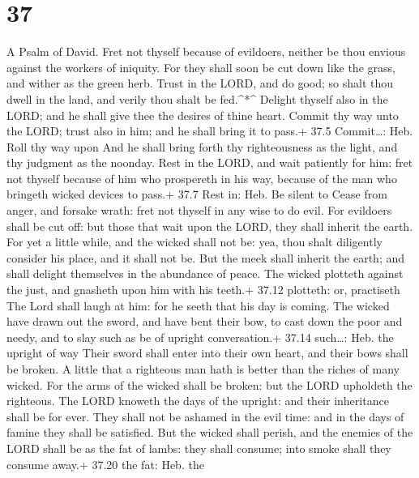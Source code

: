 \hypertarget{section-36}{%
\section{37}\label{section-36}}

A Psalm of David.  Fret not thyself because of evildoers,
neither be thou envious against the workers of iniquity. 
For they shall soon be cut down like the grass, and wither as the green
herb.  Trust in the LORD, and do good; so shalt thou dwell
in the land, and verily thou shalt be fed.\^{}*\^{}  Delight
thyself also in the LORD; and he shall give thee the desires of thine
heart.  Commit thy way unto the LORD; trust also in him; and
he shall bring it to pass.+ 37.5 Commit\ldots: Heb. Roll thy way upon
 And he shall bring forth thy righteousness as the light,
and thy judgment as the noonday.  Rest in the LORD, and wait
patiently for him: fret not thyself because of him who prospereth in his
way, because of the man who bringeth wicked devices to pass.+ 37.7 Rest
in: Heb. Be silent to  Cease from anger, and forsake wrath:
fret not thyself in any wise to do evil.  For evildoers
shall be cut off: but those that wait upon the LORD, they shall inherit
the earth.  For yet a little while, and the wicked shall
not be: yea, thou shalt diligently consider his place, and it shall not
be.  But the meek shall inherit the earth; and shall
delight themselves in the abundance of peace.  The wicked
plotteth against the just, and gnasheth upon him with his teeth.+ 37.12
plotteth: or, practiseth  The Lord shall laugh at him: for
he seeth that his day is coming.  The wicked have drawn out
the sword, and have bent their bow, to cast down the poor and needy, and
to slay such as be of upright conversation.+ 37.14 such\ldots: Heb. the
upright of way  Their sword shall enter into their own
heart, and their bows shall be broken.  A little that a
righteous man hath is better than the riches of many wicked.
 For the arms of the wicked shall be broken: but the LORD
upholdeth the righteous.  The LORD knoweth the days of the
upright: and their inheritance shall be for ever.  They
shall not be ashamed in the evil time: and in the days of famine they
shall be satisfied.  But the wicked shall perish, and the
enemies of the LORD shall be as the fat of lambs: they shall consume;
into smoke shall they consume away.+ 37.20 the fat: Heb. the

